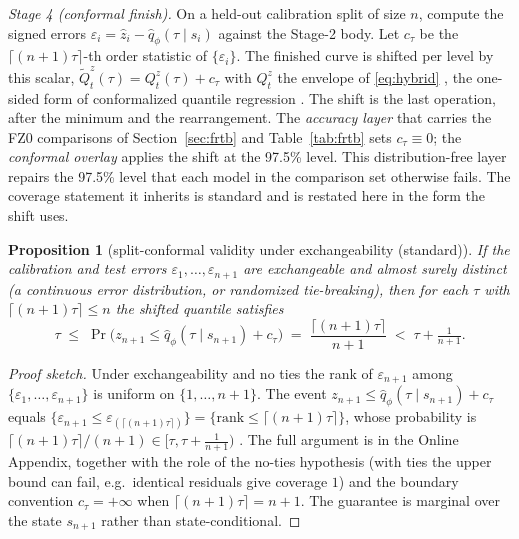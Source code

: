 \documentclass[11pt]{article}
\newtheorem{proposition}{Proposition}
\theoremstyle{remark}
\begin{document}
\emph{Stage 4 (conformal finish).} On a held-out calibration split of size $n$, compute the signed errors $\varepsilon_i = \widehat{z}_i - \widehat{q}_\phi(\tau \mid s_i)$ against the Stage-2 body. Let $c_\tau$ be the $\lceil (n{+}1)\tau \rceil$-th order statistic of $\{\varepsilon_i\}$. The finished curve is shifted per level by this scalar, $\widetilde{Q}^{z}_t(\tau) = Q^{z}_t(\tau) + c_\tau$ with $Q^{z}_t$ the envelope of \eqref{eq:hybrid} \citep{vovk2005, lei2018}, the one-sided form of conformalized quantile regression \citep{romano2019cqr}. The shift is the last operation, after the minimum and the rearrangement. The \emph{accuracy layer} that carries the FZ0 comparisons of Section~\ref{sec:frtb} and Table~\ref{tab:frtb} sets $c_\tau\equiv0$; the \emph{conformal overlay} applies the shift at the 97.5\% level. This distribution-free layer repairs
the 97.5\% level that each model in the comparison set otherwise fails. The coverage statement it inherits is standard \citep{vovk2005, lei2018, romano2019cqr} and is restated here in the form the shift uses.

\begin{proposition}[split-conformal validity under
exchangeability (standard)]\label{prop:conformal}
If the calibration and test errors $\varepsilon_1,\dots,\varepsilon_{n+1}$ are
exchangeable and almost surely distinct (a continuous error
distribution, or randomized tie-breaking), then for each $\tau$ with
$\lceil(n{+}1)\tau\rceil \le n$ the shifted quantile satisfies
\[
\tau \;\le\; \Pr\big(z_{n+1} \le \widehat{q}_\phi(\tau \mid s_{n+1}) + c_\tau\big)
\;=\; \frac{\lceil(n{+}1)\tau\rceil}{n+1}
\;<\; \tau + \tfrac{1}{n+1}.
\]
\end{proposition}
\begin{proof}[Proof sketch]
Under exchangeability and no ties the rank of $\varepsilon_{n+1}$ among
$\{\varepsilon_1,\dots,\varepsilon_{n+1}\}$ is uniform on $\{1,\dots,n+1\}$. The event
$z_{n+1}\le\widehat{q}_\phi(\tau\mid s_{n+1})+c_\tau$ equals $\{\varepsilon_{n+1}\le
\varepsilon_{(\lceil(n+1)\tau\rceil)}\}=\{\mathrm{rank}\le\lceil(n{+}1)\tau\rceil\}$,
whose probability is $\lceil(n{+}1)\tau\rceil/(n+1)\in[\tau,\tau+\tfrac1{n+1})$
\citep{vovk2005}. The full argument is in the Online Appendix, together with the role of the no-ties hypothesis (with ties the upper bound can fail, e.g.\ identical residuals give coverage $1$) and the boundary convention $c_\tau=+\infty$ when $\lceil(n{+}1)\tau\rceil=n+1$. The guarantee is marginal over the state $s_{n+1}$ rather than state-conditional.
\end{proof}
\end{document}
